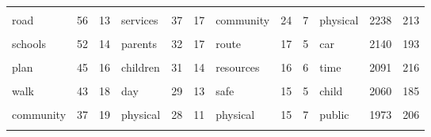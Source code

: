 \documentclass[preprint, 3p,
authoryear]{elsarticle} %
\begin{document}
\begin{table}
{\begin{tabular}[t]{lcclcclcclcc}
\cellcolor{gray!6}{traffic} & \cellcolor{gray!6}{59} & \cellcolor{gray!6}{20} & \cellcolor{gray!6}{safe} & \cellcolor{gray!6}{39} & \cellcolor{gray!6}{19} & \cellcolor{gray!6}{children} & \cellcolor{gray!6}{25} & \cellcolor{gray!6}{6} & \cellcolor{gray!6}{activity} & \cellcolor{gray!6}{2265} & \cellcolor{gray!6}{207}\\
road & 56 & 13 & services & 37 & 17 & community & 24 & 7 & physical & 2238 & 213\\
\addlinespace
\cellcolor{gray!6}{activity} & \cellcolor{gray!6}{55} & \cellcolor{gray!6}{14} & \cellcolor{gray!6}{planning} & \cellcolor{gray!6}{37} & \cellcolor{gray!6}{7} & \cellcolor{gray!6}{bus} & \cellcolor{gray!6}{18} & \cellcolor{gray!6}{4} & \cellcolor{gray!6}{trips} & \cellcolor{gray!6}{2164} & \cellcolor{gray!6}{168}\\
schools & 52 & 14 & parents & 32 & 17 & route & 17 & 5 & car & 2140 & 193\\
\cellcolor{gray!6}{children} & \cellcolor{gray!6}{47} & \cellcolor{gray!6}{15} & \cellcolor{gray!6}{sustainable} & \cellcolor{gray!6}{31} & \cellcolor{gray!6}{8} & \cellcolor{gray!6}{zone} & \cellcolor{gray!6}{16} & \cellcolor{gray!6}{6} & \cellcolor{gray!6}{safety} & \cellcolor{gray!6}{2111} & \cellcolor{gray!6}{202}\\
plan & 45 & 16 & children & 31 & 14 & resources & 16 & 6 & time & 2091 & 216\\
\cellcolor{gray!6}{students} & \cellcolor{gray!6}{44} & \cellcolor{gray!6}{14} & \cellcolor{gray!6}{child} & \cellcolor{gray!6}{31} & \cellcolor{gray!6}{12} & \cellcolor{gray!6}{day} & \cellcolor{gray!6}{16} & \cellcolor{gray!6}{4} & \cellcolor{gray!6}{factors} & \cellcolor{gray!6}{2083} & \cellcolor{gray!6}{214}\\
\addlinespace
walk & 43 & 18 & day & 29 & 13 & safe & 15 & 5 & child & 2060 & 185\\
\cellcolor{gray!6}{public} & \cellcolor{gray!6}{39} & \cellcolor{gray!6}{15} & \cellcolor{gray!6}{routes} & \cellcolor{gray!6}{28} & \cellcolor{gray!6}{14} & \cellcolor{gray!6}{planning} & \cellcolor{gray!6}{15} & \cellcolor{gray!6}{4} & \cellcolor{gray!6}{walk} & \cellcolor{gray!6}{1985} & \cellcolor{gray!6}{198}\\
community & 37 & 19 & physical & 28 & 11 & physical & 15 & 7 & public & 1973 & 206\\
\cellcolor{gray!6}{safe} & \cellcolor{gray!6}{34} & \cellcolor{gray!6}{16} & \cellcolor{gray!6}{health} & \cellcolor{gray!6}{28} & \cellcolor{gray!6}{11} & \cellcolor{gray!6}{healthy} & \cellcolor{gray!6}{14} & \cellcolor{gray!6}{6} & \cellcolor{gray!6}{age} & \cellcolor{gray!6}{1774} & \cellcolor{gray!6}{209}\\

\end{tabular}}
\end{table}
\end{document}
